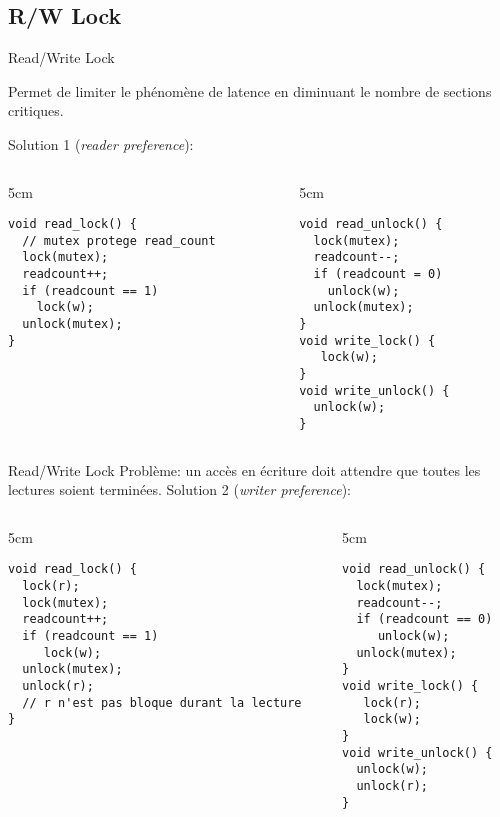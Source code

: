 \subsection{R/W Lock}

\begin{frame}[fragile]{Read/Write Lock}

Permet de limiter le phénomène  de latence en diminuant le nombre de
sections critiques.

Solution 1 (\emph{reader preference}):
\begin{columns}
  \begin{column} {5cm}
    \begin{lstlisting}
void read_lock() {
  // mutex protege read_count
  lock(mutex);
  readcount++;
  if (readcount == 1)
    lock(w);
  unlock(mutex);
}
    \end{lstlisting}
  \end{column}
  \begin{column} {5cm}
    \begin{lstlisting}
void read_unlock() {
  lock(mutex);
  readcount--;
  if (readcount = 0)
    unlock(w);
  unlock(mutex);
}
void write_lock() {
   lock(w);
}
void write_unlock() {
  unlock(w);
}
    \end{lstlisting}
  \end{column}
\end{columns}
\end{frame}

\begin{frame}[fragile]{Read/Write Lock}
  Problème: un accès en écriture doit attendre que toutes les lectures
  soient terminées. Solution 2 (\emph{writer preference}):
  \begin{columns}
    \begin{column} {5cm}
      \begin{lstlisting}
void read_lock() {
  lock(r);
  lock(mutex);
  readcount++;
  if (readcount == 1)
     lock(w);
  unlock(mutex);
  unlock(r);
  // r n'est pas bloque durant la lecture
}
       \end{lstlisting}
     \end{column}
     \begin{column} {5cm}
       \begin{lstlisting}
void read_unlock() {
  lock(mutex);
  readcount--;
  if (readcount == 0)
     unlock(w);
  unlock(mutex);
}
void write_lock() {
   lock(r);
   lock(w);
}
void write_unlock() {
  unlock(w);
  unlock(r);
}
      \end{lstlisting}
    \end{column}
  \end{columns}
\end{frame}

